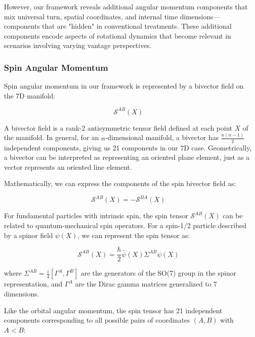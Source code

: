 \documentclass{article}
\begin{document}
However, our framework reveals additional angular momentum components that mix universal turn, spatial coordinates, and internal time dimensions—components that are "hidden" in conventional treatments. These additional components encode aspects of rotational dynamics that become relevant in scenarios involving varying vantage perspectives.

\subsubsection{Spin Angular Momentum}

Spin angular momentum in our framework is represented by a bivector field on the 7D manifold:

\begin{equation}
\mathcal{S}^{AB}(X)
\end{equation}

A bivector field is a rank-2 antisymmetric tensor field defined at each point $X$ of the manifold. In general, for an $n$-dimensional manifold, a bivector has $\frac{n(n-1)}{2}$ independent components, giving us 21 components in our 7D case. Geometrically, a bivector can be interpreted as representing an oriented plane element, just as a vector represents an oriented line element.

Mathematically, we can express the components of the spin bivector field as:

\begin{equation}
\mathcal{S}^{AB}(X) = -\mathcal{S}^{BA}(X)
\end{equation}

For fundamental particles with intrinsic spin, the spin tensor $\mathcal{S}^{AB}(X)$ can be related to quantum-mechanical spin operators. For a spin-1/2 particle described by a spinor field $\psi(X)$, we can represent the spin tensor as:

\begin{equation}
\mathcal{S}^{AB}(X) = \frac{\hbar}{2} \bar{\psi}(X) \Sigma^{AB} \psi(X)
\end{equation}

where $\Sigma^{AB} = \frac{i}{4}[\Gamma^A, \Gamma^B]$ are the generators of the SO(7) group in the spinor representation, and $\Gamma^A$ are the Dirac gamma matrices generalized to 7 dimensions.

Like the orbital angular momentum, the spin tensor has 21 independent components corresponding to all possible pairs of coordinates $(A,B)$ with $A < B$:
\end{document}
